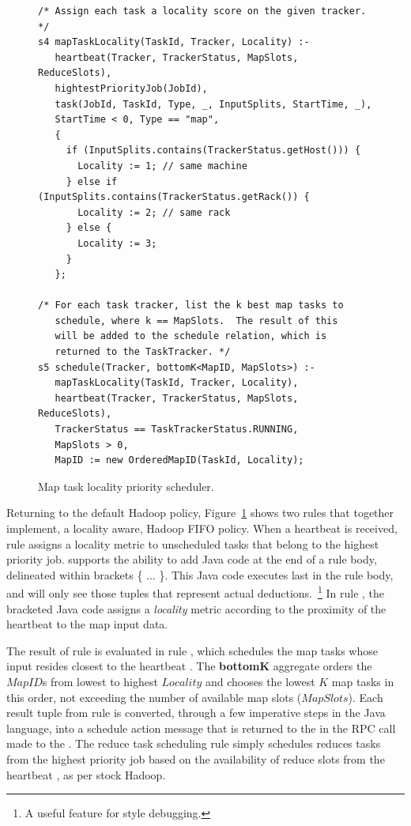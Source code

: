 \begin{figure}
\ssp
\centering
\begin{lstlisting}
/* Assign each task a locality score on the given tracker. */
s4 mapTaskLocality(TaskId, Tracker, Locality) :-
   heartbeat(Tracker, TrackerStatus, MapSlots, ReduceSlots),
   hightestPriorityJob(JobId),
   task(JobId, TaskId, Type, _, InputSplits, StartTime, _),
   StartTime < 0, Type == "map",
   {
     if (InputSplits.contains(TrackerStatus.getHost())) { 
       Locality := 1; // same machine
     } else if (InputSplits.contains(TrackerStatus.getRack()) { 
       Locality := 2; // same rack
     } else {
       Locality := 3;
     }
   };
	
/* For each task tracker, list the k best map tasks to 
   schedule, where k == MapSlots.  The result of this 
   will be added to the schedule relation, which is 
   returned to the TaskTracker. */
s5 schedule(Tracker, bottomK<MapID, MapSlots>) :-
   mapTaskLocality(TaskId, Tracker, Locality),
   heartbeat(Tracker, TrackerStatus, MapSlots, ReduceSlots),
   TrackerStatus == TaskTrackerStatus.RUNNING,
   MapSlots > 0,
   MapID := new OrderedMapID(TaskId, Locality);

\end{lstlisting}
\caption{\label{ch:boom:fig:schedule} Map task locality priority scheduler.}
\end{figure}

Returning to the default Hadoop policy, Figure~\ref{ch:boom:fig:schedule} shows
two rules that together implement, a locality aware, Hadoop FIFO policy.  When
a \TT heartbeat is received, rule  assigns a locality metric to
unscheduled tasks that belong to the highest priority job.  \JOL supports the
ability to add Java code at the end of a rule body, delineated within brackets
\{ ...  \}.  This Java code executes last in the rule body, and will only see
those tuples that represent actual deductions.~\footnote{A useful feature for
 style debugging.} In rule , the bracketed Java code assigns
a {\em locality} metric according to the proximity of the heartbeat \TT to the
map input data.

The result of rule  is evaluated in rule , which schedules the
map tasks whose input resides closest to the heartbeat \TT.  The {\bf bottomK}
aggregate orders the $MapID$s from lowest to highest $Locality$ and chooses the
lowest $K$ map tasks in this order, not exceeding the number of available map
slots ($MapSlots$).  Each result tuple from rule  is converted, through
a few imperative steps in the Java language, into a schedule action message
that is returned to the \TT in the RPC call made to the \JT.  The reduce task
scheduling rule simply schedules reduces tasks from the highest priority job
based on the availability of reduce slots from the heartbeat \TT, as per stock
Hadoop.

